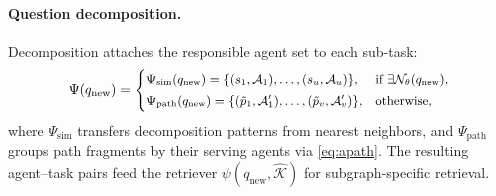 \documentclass[sigconf]{acmart}
\begin{document}
\paragraph{Question decomposition.}
Decomposition attaches the responsible agent set to each sub-task:
\begin{equation}
\small
\label{eq:decomposition}
\Psi(q_{\text{new}})
=
\begin{cases}
\Psi_{\text{sim}}(q_{\text{new}})
= \{ (s_1,\mathcal{A}_1),\ldots,(s_u,\mathcal{A}_u)\},
& \text{if } \exists \mathcal{N}_\theta(q_{\text{new}}),\\[2pt]
\Psi_{\text{path}}(q_{\text{new}})
= \{ (\tilde{p}_1,\mathcal{A}'_1),\ldots,(\tilde{p}_v,\mathcal{A}'_v)\},
& \text{otherwise,}
\end{cases}
\end{equation}
where \(\Psi_{\text{sim}}\) transfers decomposition patterns from nearest neighbors,
and \(\Psi_{\text{path}}\) groups path fragments by their serving agents via \eqref{eq:apath}.
The resulting agent–task pairs feed the retriever \(\psi(q_{\text{new}},\hat{\mathcal{K}})\) for subgraph-specific retrieval.
\end{document}
